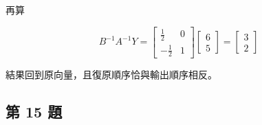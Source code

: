 \documentclass[11pt,a4paper]{article}
\begin{document}
\begin{enumerate}
  再算

  \[
  B^{-1}A^{-1}Y
  =\begin{bmatrix}\frac12&0\\-\frac12&1\end{bmatrix}
  \begin{bmatrix}6\\5\end{bmatrix}
  =\begin{bmatrix}3\\2\end{bmatrix}
  \]

  結果回到原向量，且復原順序恰與輸出順序相反。
\end{enumerate}

\subsection{第 15 題}\label{ux7b2c-15-ux984c}
\end{document}
